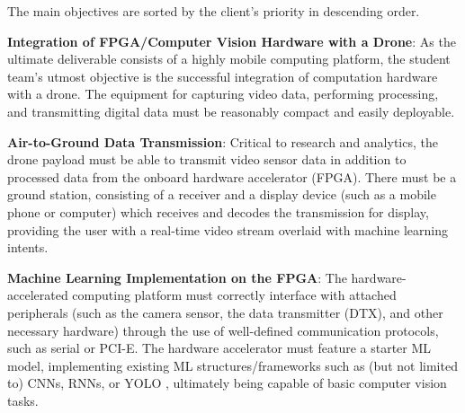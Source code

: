 The main objectives are sorted by the client's priority in descending order.

\textbf{Integration of FPGA/Computer Vision Hardware with a Drone}:
As the ultimate deliverable consists of a highly mobile computing platform,
the student team's utmost objective is the successful integration of computation hardware with a drone.
The equipment for capturing video data, performing processing, and transmitting digital data must be reasonably compact and easily deployable.

\textbf{Air-to-Ground Data Transmission}:
Critical to research and analytics, the drone payload must be able to transmit video sensor data in addition to processed data
from the onboard hardware accelerator (FPGA). There must be a ground station, consisting of a receiver and a display device (such as a mobile phone or 
computer) which receives and decodes the transmission for display, providing the user with a real-time video stream overlaid with machine learning intents.


\textbf{Machine Learning Implementation on the FPGA}:
The hardware-accelerated computing platform must correctly interface with attached peripherals (such as the camera sensor, the data transmitter (DTX), and other necessary hardware) through the use of well-defined communication protocols, such as serial or PCI-E. The hardware accelerator must feature a starter ML model, implementing existing ML structures/frameworks such as (but not limited to) CNNs, RNNs, or YOLO \cite{yolo}, ultimately being capable of basic computer vision tasks.
